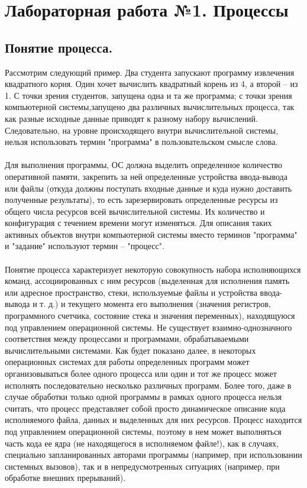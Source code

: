 \documentclass[a4paper]{article}
\begin{document}
\section{\bf Лабораторная работа №1. Процессы}
\subsection{\Large Понятие процесса.}
\rm Рассмотрим следующий пример. Два студента запускают программу извлечения квадратного корня. Один хочет вычислить квадратный корень из 4, а второй – из 1. С точки зрения студентов, запущена одна и та же программа; с точки зрения компьютерной системы,запущено два различных вычислительных процесса, так как разные исходные данные приводят к разному набору вычислений. Следовательно, на уровне происходящего внутри вычислительной системы, нельзя использовать термин "программа" в пользовательском смысле слова. \\\\
Для выполнения программы, ОС должна выделить определенное количество оперативной памяти, закрепить за ней определенные устройства ввода-вывода или файлы (откуда должны поступать входные данные и куда нужно доставить полученные результаты), то есть зарезервировать определенные ресурсы из общего числа ресурсов всей вычислительной системы. Их количество и конфигурация с течением времени могут изменяться. Для описания таких активных объектов внутри компьютерной системы вместо терминов "программа" и "задание" используют термин – "процесс".\\\\
Понятие процесса характеризует некоторую совокупность набора исполняющихся команд, ассоциированных с ним ресурсов (выделенная для исполнения память или адресное пространство, стеки, используемые файлы и устройства ввода-вывода и т. д.) и текущего момента его выполнения (значения регистров, программного счетчика, состояние стека и значения переменных), находящуюся под управлением операционной системы. Не существует взаимно-однозначного соответствия между процессами и программами, обрабатываемыми вычислительными системами. Как будет показано далее, в некоторых операционных системах для работы определенных программ может организовываться более одного процесса или один и тот же процесс может исполнять последовательно несколько различных программ. Более того, даже в случае обработки только одной программы в рамках одного процесса нельзя считать, что процесс представляет собой просто динамическое описание кода исполняемого файла, данных и выделенных для них ресурсов. Процесс находится под управлением операционной системы, поэтому в нем может выполняться часть кода ее ядра (не находящегося в исполняемом файле!), как в случаях, специально запланированных авторами программы (например, при использовании системных вызовов), так и в непредусмотренных ситуациях (например, при обработке внешних прерываний).
\end{document}
